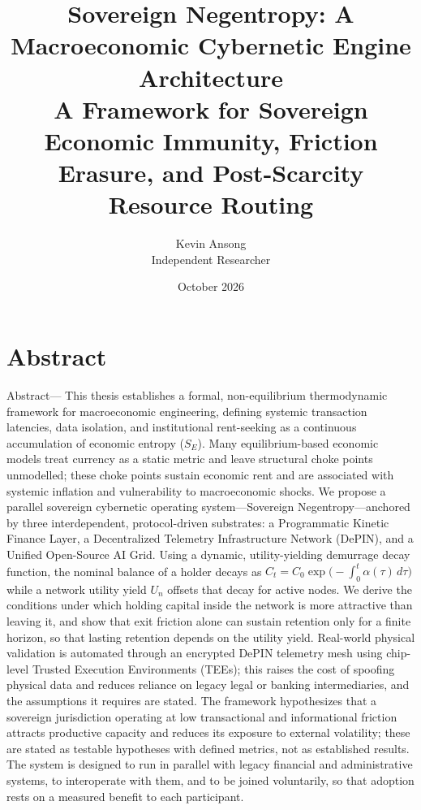 \documentclass[11pt,a4paper]{article}
\title{\textbf{Sovereign Negentropy: A Macroeconomic Cybernetic Engine Architecture}\\[1.2em]
\large A Framework for Sovereign Economic Immunity, Friction Erasure, and Post-Scarcity Resource Routing}
\author{Kevin Ansong\\ Independent Researcher}
\date{October 2026}
\theoremstyle{definition}
\theoremstyle{plain}
\theoremstyle{remark}
\begin{document}
\maketitle

\section*{Abstract}
Abstract--- This thesis establishes a formal, non-equilibrium thermodynamic framework for macroeconomic engineering, defining systemic transaction latencies, data isolation, and institutional rent-seeking as a continuous accumulation of economic entropy ($S_E$). Many equilibrium-based economic models treat currency as a static metric and leave structural choke points unmodelled; these choke points sustain economic rent and are associated with systemic inflation and vulnerability to macroeconomic shocks. We propose a parallel sovereign cybernetic operating system---Sovereign Negentropy---anchored by three interdependent, protocol-driven substrates: a Programmatic Kinetic Finance Layer, a Decentralized Telemetry Infrastructure Network (DePIN), and a Unified Open-Source AI Grid. Using a dynamic, utility-yielding demurrage decay function, the nominal balance of a holder decays as $C_t = C_0\exp\!\big(-\int_0^t \alpha(\tau)\,d\tau\big)$ while a network utility yield $U_n$ offsets that decay for active nodes. We derive the conditions under which holding capital inside the network is more attractive than leaving it, and show that exit friction alone can sustain retention only for a finite horizon, so that lasting retention depends on the utility yield. Real-world physical validation is automated through an encrypted DePIN telemetry mesh using chip-level Trusted Execution Environments (TEEs); this raises the cost of spoofing physical data and reduces reliance on legacy legal or banking intermediaries, and the assumptions it requires are stated. The framework hypothesizes that a sovereign jurisdiction operating at low transactional and informational friction attracts productive capacity and reduces its exposure to external volatility; these are stated as testable hypotheses with defined metrics, not as established results. The system is designed to run in parallel with legacy financial and administrative systems, to interoperate with them, and to be joined voluntarily, so that adoption rests on a measured benefit to each participant.
\end{document}
